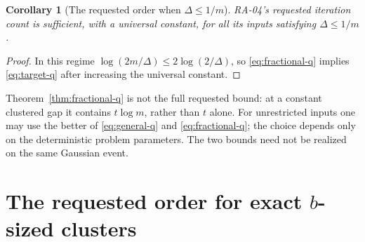 \documentclass[11pt]{article}
\newtheorem{corollary}[theorem]{Corollary}
\theoremstyle{definition}
\begin{document}
\begin{corollary}[The requested order when $\Delta\leq1/m$]
\label{cor:smallgap}
RA-04's requested iteration count is sufficient, with a universal constant,
for all its inputs satisfying $\Delta\leq1/m$.
\end{corollary}
\begin{proof}
In this regime
$\log(2m/\Delta)\leq2\log(2/\Delta)$, so
\eqref{eq:fractional-q} implies \eqref{eq:target-q} after increasing the
universal constant.
\end{proof}

Theorem~\ref{thm:fractional-q} is not the full requested bound: at a
constant clustered gap it contains $t\log m$, rather than $t$ alone.
For unrestricted inputs one may use the better of
\eqref{eq:general-q} and \eqref{eq:fractional-q}; the choice depends only on
the deterministic problem parameters. The two bounds need not be realized
on the same Gaussian event.

\section{The requested order for exact \texorpdfstring{$b$}{b}-sized clusters}
\label{sec:clusters}
\end{document}
